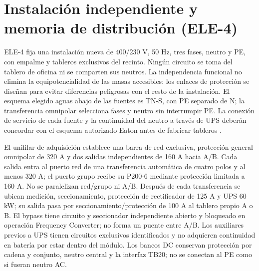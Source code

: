 \section{Instalación independiente y memoria de distribución (ELE-4)}
\label{sec:sd4-electrica-ele4}

ELE-4 fija una instalación nueva de 400/230 V, 50 Hz, tres fases, neutro y PE, con empalme y tableros exclusivos del recinto. Ningún circuito se toma del tablero de oficina ni se comparten sus neutros. La independencia funcional no elimina la equipotencialidad de las masas accesibles: los enlaces de protección se diseñan para evitar diferencias peligrosas con el resto de la instalación. El esquema elegido aguas abajo de las fuentes es TN-S, con PE separado de N; la transferencia omnipolar selecciona fases y neutro sin interrumpir PE. La conexión de servicio de cada fuente y la continuidad del neutro a través de UPS deberán concordar con el esquema autorizado Eaton antes de fabricar tableros \parencites{lote10-sec-ric}{lote13-sec-ric05}{lote13-sec-ric06}[pp.~33--35]{p7-eaton-93t-guia}.

El unifilar de adquisición establece una barra de red exclusiva, protección general omnipolar de 320 A y dos salidas independientes de 160 A hacia A/B. Cada salida entra al puerto red de una transferencia automática de cuatro polos y al menos 320 A; el puerto grupo recibe su P200-6 mediante protección limitada a 160 A. No se paralelizan red/grupo ni A/B. Después de cada transferencia se ubican medición, seccionamiento, protección de rectificador de 125 A y UPS 60 kW; su salida pasa por seccionamiento/protección de 100 A al tablero propio A o B. El bypass tiene circuito y seccionador independiente abierto y bloqueado en operación Frequency Converter; no forma un puente entre A/B. Los auxiliares previos a UPS tienen circuitos exclusivos identificados y no adquieren continuidad en batería por estar dentro del módulo. Los bancos DC conservan protección por cadena y conjunto, neutro central y la interfaz TB20; no se conectan al PE como si fueran neutro AC.

